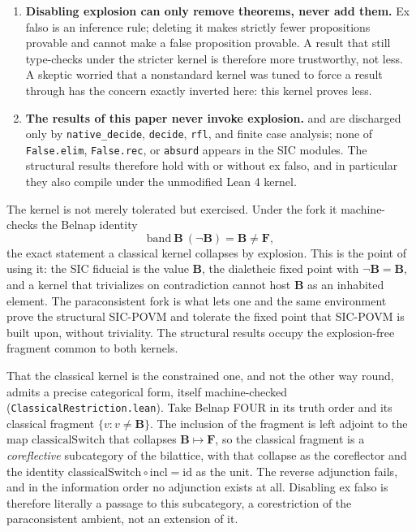 \documentclass[12pt,a4paper]{article}
\begin{document}
\begin{enumerate}
\item \textbf{Disabling explosion can only remove theorems, never add them.}
Ex falso is an inference rule; deleting it makes strictly fewer propositions
provable and cannot make a false proposition provable. A result that still
type-checks under the stricter kernel is therefore more trustworthy, not less.
A skeptic worried that a nonstandard kernel was tuned to force a result through
has the concern exactly inverted here: this kernel proves less.
\item \textbf{The results of this paper never invoke explosion.}
 and  are discharged only by
\texttt{native\_decide}, \texttt{decide}, \texttt{rfl}, and finite case
analysis; none of \texttt{False.elim}, \texttt{False.rec}, or \texttt{absurd}
appears in the SIC modules. The structural results therefore hold with or
without ex falso, and in particular they also compile under the unmodified
Lean 4 kernel.
\end{enumerate}

The kernel is not merely tolerated but exercised. Under the fork it machine-checks
the Belnap identity
\[
\mathrm{band}\ \mathbf{B}\ (\lnot \mathbf{B}) = \mathbf{B} \neq \mathbf{F},
\]
the exact statement a classical kernel collapses by explosion. This is the point
of using it: the SIC fiducial is the value $\mathbf{B}$, the dialetheic fixed
point with $\lnot\mathbf{B} = \mathbf{B}$, and a kernel that trivializes on
contradiction cannot host $\mathbf{B}$ as an inhabited element. The paraconsistent
fork is what lets one and the same environment prove the structural SIC-POVM and
tolerate the fixed point that SIC-POVM is built upon, without triviality. The
structural results occupy the explosion-free fragment common to both kernels.

That the classical kernel is the constrained one, and not the other way round,
admits a precise categorical form, itself machine-checked
(\texttt{ClassicalRestriction.lean}). Take Belnap FOUR in its truth order and
its classical fragment $\{v : v \neq \mathbf{B}\}$. The inclusion of the fragment
is left adjoint to the map $\mathrm{classicalSwitch}$ that collapses
$\mathbf{B} \mapsto \mathbf{F}$, so the classical fragment is a \emph{coreflective}
subcategory of the bilattice, with that collapse as the coreflector and the
identity $\mathrm{classicalSwitch}\circ\text{incl} = \mathrm{id}$ as the unit. The
reverse adjunction fails, and in the information order no adjunction exists at all.
Disabling ex falso is therefore literally a passage to this subcategory, a
corestriction of the paraconsistent ambient, not an extension of it.
\end{document}

